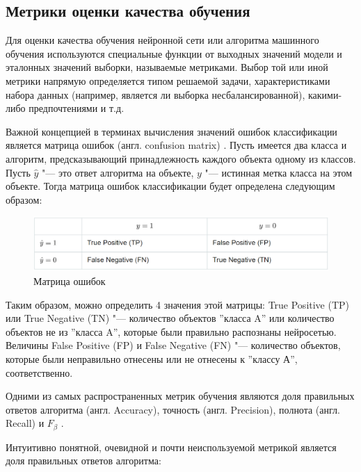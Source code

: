 \documentclass[bachelor, och, coursework]{SCWorks}
\begin{document}
    \subsection{Метрики оценки качества обучения}

        Для оценки качества обучения нейронной сети или алгоритма машинного
        обучения используются специальные функции от выходных значений модели и
        эталонных значений выборки, называемые метриками. Выбор той или иной
        метрики напрямую определяется типом решаемой задачи, характеристиками
        набора данных (например, является ли выборка несбалансированной),
        какими-либо предпочтениями и т.д.

        Важной концепцией в терминах вычисления значений ошибок классификации
        является матрица ошибок (англ. confusion matrix) \cite{mat}. Пусть
        имеется два класса и алгоритм, предсказывающий принадлежность каждого
        объекта одному из классов. Пусть $\hat y$ "--- это ответ алгоритма на
        объекте, $y$ "--- истинная метка класса на этом объекте. Тогда матрица
        ошибок классификации будет определена следующим образом:

        \begin{figure}[H]
            \centering
            \includegraphics[width=1\textwidth]{pic/matrix.png}
            \caption{Матрица ошибок}
        \end{figure}

        Таким образом, можно определить 4 значения этой матрицы: True Positive
        (TP) или True Negative (TN) "--- количество объектов ''класса A'' или
        количество объектов не из ''класса A'', которые были правильно
        распознаны нейросетью. Величины False Positive (FP) и False Negative
        (FN) "--- количество объектов, которые были неправильно отнесены или не
        отнесены к ''классу А'', соответственно.

        Одними из самых распространенных метрик обучения являются доля
        правильных ответов алгоритма (англ. Accuracy), точность (англ.
        Precision), полнота (англ. Recall) и $F_\beta$ \cite{scores}.

        Интуитивно понятной, очевидной и почти неиспользуемой метрикой является
        доля правильных ответов алгоритма:
\end{document}
